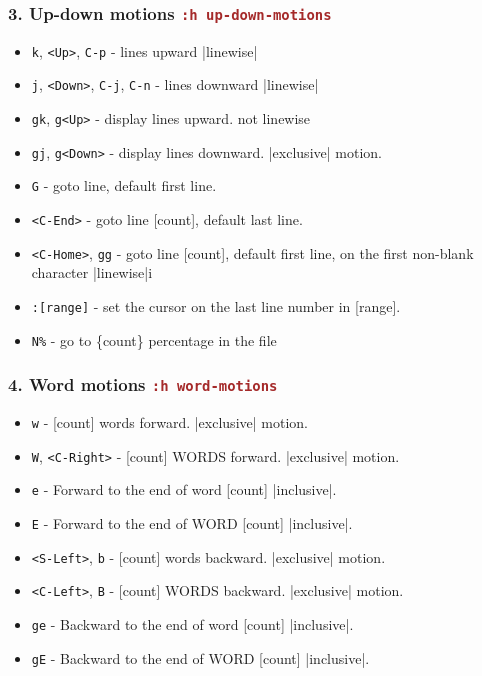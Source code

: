 \documentclass{beamer}
\newcommand{\vimcommand}[1]{\texttt{\textcolor{brown}{#1}}}
\newcommand{\vimhelp}[1]{\vimcommand{:h #1}}
\newcommand{\vimkey}[1]{\textless{}#1\textgreater{}}
\begin{document}
\begin{frame}
    \frametitle{3. Up-down motions \vimhelp{up-down-motions}}
    \begin{itemize}
        \item \texttt{k}, \texttt{\textless{}Up\textgreater{}}, \texttt{C-p}                  - lines upward |linewise|
        \item \texttt{j}, \texttt{\textless{}Down\textgreater{}}, \texttt{C-j}, \texttt{C-n}  - lines downward |linewise|
        \item \texttt{gk}, \texttt{g\textless{}Up\textgreater{}}                              - display lines upward.  not linewise
        \item \texttt{gj}, \texttt{g\textless{}Down\textgreater{}}                            - display lines downward.  |exclusive| motion.
        \item \texttt{G}                                               - goto line, default first line.
        \item \texttt{\textless{}C-End\textgreater{}}                                         - goto line [count], default last line.
        \item \texttt{\textless{}C-Home\textgreater{}}, \texttt{gg}                           - goto line [count], default first line, on the first non-blank character |linewise|i
        \item \texttt{:[range]}                                        - set the cursor on the last line number in [range].
        \item \texttt{N\%}                                             - go to \{count\} percentage in the file
    \end{itemize}
\end{frame}

\begin{frame}
    \frametitle{4. Word motions \vimhelp{word-motions}}
    \begin{itemize}
        \item \texttt{w}                            - [count] words forward.  |exclusive| motion.
        \item \texttt{W}, \texttt{\vimkey{C-Right}} - [count] WORDS forward.  |exclusive| motion.
        \item \texttt{e}                            - Forward to the end of word [count] |inclusive|.
        \item \texttt{E}                            - Forward to the end of WORD [count] |inclusive|.
        \item \texttt{\vimkey{S-Left}}, \texttt{b}  - [count] words backward.  |exclusive| motion.
        \item \texttt{\vimkey{C-Left}}, \texttt{B}  - [count] WORDS backward.  |exclusive| motion.
        \item \texttt{ge}                           - Backward to the end of word [count] |inclusive|.
        \item \texttt{gE}                           - Backward to the end of WORD [count] |inclusive|.
    \end{itemize}
\end{frame}
\end{document}
